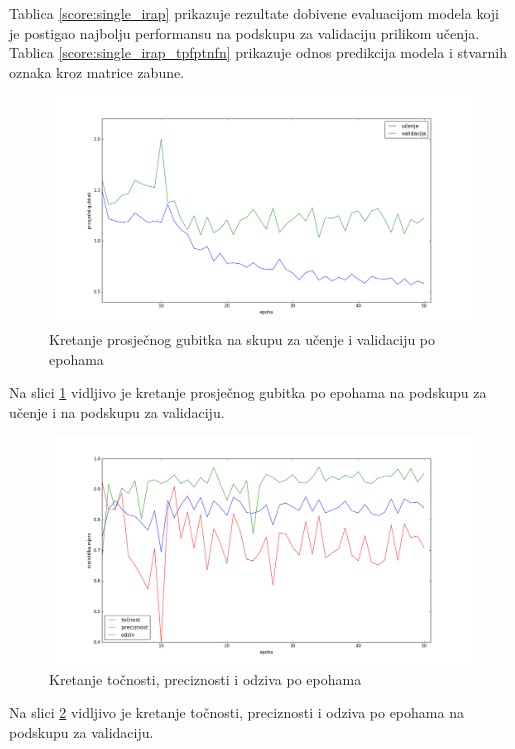 \documentclass[times, utf8, diplomski, numeric]{fer}
\begin{document}
\noindent Tablica \ref{score:single_irap} prikazuje rezultate dobivene evaluacijom modela koji je postigao najbolju performansu na podskupu za validaciju prilikom učenja.
Tablica \ref{score:single_irap_tpfptnfn} prikazuje odnos predikcija modela i stvarnih oznaka kroz matrice zabune.

\begin{figure}[H]
\centering
\includegraphics[scale=0.35]{images/single_irap_loss.png}
\caption{Kretanje prosječnog gubitka na skupu za učenje i validaciju po epohama}
\label{img:single_irap_loss}
\end{figure}
\noindent Na slici \ref{img:single_irap_loss} vidljivo je kretanje prosječnog gubitka po epohama na podskupu za učenje i na podskupu za validaciju.

\begin{figure}[H]
\centering
\includegraphics[scale=0.35]{images/single_irap_ac_ap.png}
\caption{Kretanje točnosti, preciznosti i odziva po epohama}
\label{img:single_irap_ac_ap}
\end{figure}
\noindent Na slici \ref{img:single_irap_ac_ap} vidljivo je kretanje točnosti, preciznosti i odziva po epohama na podskupu za validaciju.
\end{document}
